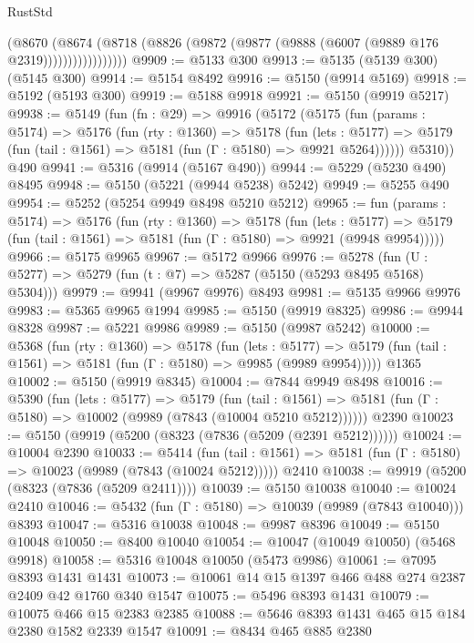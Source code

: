 \begin{lexlean}{RustStd}
\begin{coremodule}
                    (@8670
                      (@8674
                        (@8718 (@8826 (@9872 (@9877 (@9888 (@6007 (@9889 @176 @2319)))))))))))))))))
@9909 := @5133 @300
@9913 := @5135 (@5139 @300) (@5145 @300)
@9914 := @5154 @8492
@9916 := @5150 (@9914 @5169)
@9918 := @5192 (@5193 @300)
@9919 := @5188 @9918
@9921 := @5150 (@9919 @5217)
@9938 := @5149
    (fun (fn : @29) =>
    @9916
      (@5172
        (@5175
          (fun (params : @5174) =>
          @5176
            (fun (rty : @1360) =>
            @5178
              (fun (lets : @5177) =>
              @5179 (fun (tail : @1561) => @5181 (fun (Γ : @5180) => @9921 @5264))))))
        @5310))
    @490
@9941 := @5316 (@9914 (@5167 @490))
@9944 := @5229 (@5230 @490) @8495
@9948 := @5150 (@5221 (@9944 @5238) @5242)
@9949 := @5255 @490
@9954 := @5252 (@5254 @9949 @8498 @5210 @5212)
@9965 := fun (params : @5174) =>
  @5176
    (fun (rty : @1360) =>
    @5178
      (fun (lets : @5177) =>
      @5179 (fun (tail : @1561) => @5181 (fun (Γ : @5180) => @9921 (@9948 @9954)))))
@9966 := @5175 @9965
@9967 := @5172 @9966
@9976 := @5278 (fun (U : @5277) => @5279 (fun (t : @7) => @5287 (@5150 (@5293 @8495 @5168) @5304)))
@9979 := @9941 (@9967 @9976) @8493
@9981 := @5135 @9966 @9976
@9983 := @5365 @9965 @1994
@9985 := @5150 (@9919 @8325)
@9986 := @9944 @8328
@9987 := @5221 @9986
@9989 := @5150 (@9987 @5242)
@10000 := @5368
    (fun (rty : @1360) =>
    @5178
      (fun (lets : @5177) =>
      @5179 (fun (tail : @1561) => @5181 (fun (Γ : @5180) => @9985 (@9989 @9954)))))
    @1365
@10002 := @5150 (@9919 @8345)
@10004 := @7844 @9949 @8498
@10016 := @5390
    (fun (lets : @5177) =>
    @5179
      (fun (tail : @1561) =>
      @5181 (fun (Γ : @5180) => @10002 (@9989 (@7843 (@10004 @5210 @5212))))))
    @2390
@10023 := @5150 (@9919 (@5200 (@8323 (@7836 (@5209 (@2391 @5212))))))
@10024 := @10004 @2390
@10033 := @5414
    (fun (tail : @1561) => @5181 (fun (Γ : @5180) => @10023 (@9989 (@7843 (@10024 @5212)))))
    @2410
@10038 := @9919 (@5200 (@8323 (@7836 (@5209 @2411))))
@10039 := @5150 @10038
@10040 := @10024 @2410
@10046 := @5432 (fun (Γ : @5180) => @10039 (@9989 (@7843 @10040))) @8393
@10047 := @5316 @10038
@10048 := @9987 @8396
@10049 := @5150 @10048
@10050 := @8400 @10040
@10054 := @10047 (@10049 @10050) (@5468 @9918)
@10058 := @5316 @10048 @10050 (@5473 @9986)
@10061 := @7095 @8393 @1431 @1431
@10073 := @10061 @14 @15 @1397 @466 @488 @274 @2387 @2409 @42 @1760 @340 @1547
@10075 := @5496 @8393 @1431
@10079 := @10075 @466 @15 @2383 @2385
@10088 := @5646 @8393 @1431 @465 @15 @184 @2380 @1582 @2339 @1547
@10091 := @8434 @465 @885 @2380

\end{coremodule}
\end{lexlean}
